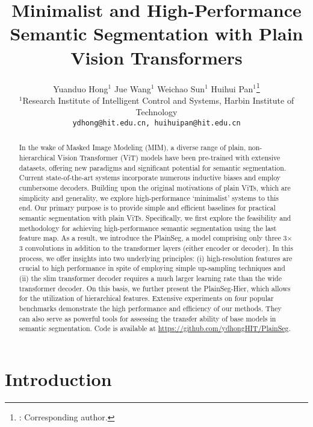 \documentclass{article} \usepackage{iclr2024_conference,times}
\title{Minimalist and High-Performance Semantic Segmentation with Plain Vision Transformers}
\author{Yuanduo Hong$^1$ \quad Jue Wang$^1$ \quad Weichao Sun$^1$ \quad Huihui Pan$^1$\thanks{: Corresponding author.}
\\
$^1$Research Institute of Intelligent Control and Systems, Harbin Institute of Technology \\
{\tt\small ydhong@hit.edu.cn, huihuipan@hit.edu.cn}
}
\begin{document}
\maketitle

\begin{abstract}
In the wake of Masked Image Modeling (MIM), a diverse range of plain, non-hierarchical Vision Transformer (ViT) models have been pre-trained with extensive datasets, offering new paradigms and significant potential for semantic segmentation. Current state-of-the-art systems incorporate numerous inductive biases and employ cumbersome decoders. Building upon the original motivations of plain ViTs, which are simplicity and generality, we explore high-performance `minimalist' systems to this end. Our primary purpose is to provide simple and efficient baselines for practical semantic segmentation with plain ViTs. Specifically, we first explore the feasibility and methodology for achieving high-performance semantic segmentation using the last feature map. As a result, we introduce the PlainSeg, a model comprising only three 3$\times$3 convolutions in addition to the transformer layers (either encoder or decoder). In this process, we offer insights into two underlying principles: (i) high-resolution features are crucial to high performance in spite of employing simple up-sampling techniques and (ii) the slim transformer decoder requires a much larger learning rate than the wide transformer decoder. On this basis, we further present the PlainSeg-Hier, which allows for the utilization of hierarchical features. Extensive experiments on four popular benchmarks demonstrate the high performance and efficiency of our methods. They can also serve as powerful tools for assessing the transfer ability of base models in semantic segmentation. Code is available at \url{https://github.com/ydhongHIT/PlainSeg}.
\end{abstract}

\section{Introduction}
\end{document}
